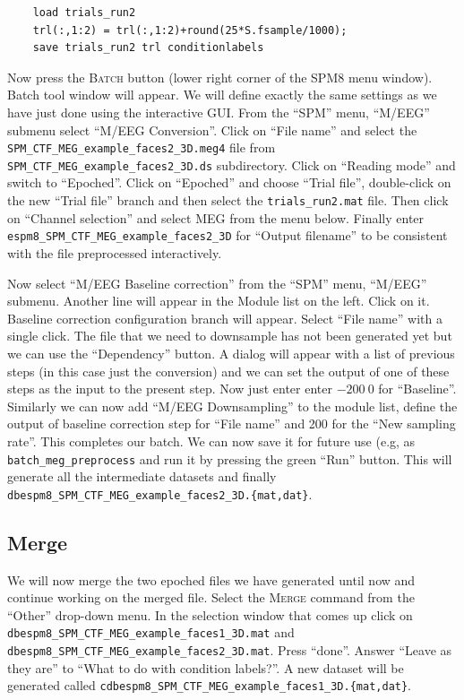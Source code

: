 \begin{verbatim}
    load trials_run2
    trl(:,1:2) = trl(:,1:2)+round(25*S.fsample/1000);
    save trials_run2 trl conditionlabels
\end{verbatim}

Now press the \textsc{Batch} button (lower right corner of the SPM8 menu window). Batch tool window will appear. We will define exactly the same settings as we have just done using the interactive GUI. From the ``SPM'' menu, ``M/EEG'' submenu select ``M/EEG Conversion''. Click on ``File name'' and select the \texttt{SPM\_CTF\_MEG\_example\_faces2\_3D.meg4} file from \texttt{SPM\_CTF\_\-MEG\_\-example\_\-faces2\_3D.ds} subdirectory. Click on ``Reading mode'' and switch to ``Epoched''. Click on ``Epoched'' and choose ``Trial file'', double-click on the new ``Trial file'' branch and then select the \texttt{trials\_run2.mat} file.  Then click on ``Channel selection'' and select MEG from the menu below. Finally enter \texttt{espm8\_SPM\_CTF\_MEG\_example\_faces2\_3D} for ``Output filename'' to be consistent with the file preprocessed interactively.

Now select ``M/EEG Baseline correction'' from the ``SPM'' menu, ``M/EEG'' submenu. Another line will appear in the Module list on the left. Click on it. Baseline correction configuration branch will appear. Select ``File name'' with a single click. The file that we need to downsample has not been generated yet but we can use the ``Dependency'' button. A dialog will appear with a list of previous steps (in this case just the conversion) and we can set the output of one of these steps as the input to the present step. Now just enter enter $-200\: 0$ for ``Baseline''. Similarly we can now add ``M/EEG Downsampling'' to the module list, define the output of baseline correction step for ``File name'' and 200 for the ``New sampling rate''. This completes our batch. We can now save it for future use (e.g, as \texttt{batch\_meg\_preprocess} and run it by pressing the green ``Run'' button. This will generate all the intermediate datasets and finally \texttt{dbespm8\_SPM\_CTF\_MEG\_example\_faces2\_3D.\{mat,dat\}}.

\subsection{Merge}

We will now merge the two epoched files we have generated until now and continue working on the merged file. Select the \textsc{Merge} command from the ``Other'' drop-down menu. In the selection window that comes up click on \texttt{dbespm8\_SPM\_CTF\_MEG\_example\_faces1\_3D.mat} and \texttt{dbespm8\_SPM\_CTF\_MEG\_example\_faces2\_3D.mat}. Press ``done''. Answer ``Leave as they are'' to ``What to do with condition labels?''. A new dataset will be generated called \texttt{cdbespm8\_SPM\_CTF\_\-MEG\_\-example\_\-faces1\_\-3D.\{mat,dat\}}.

